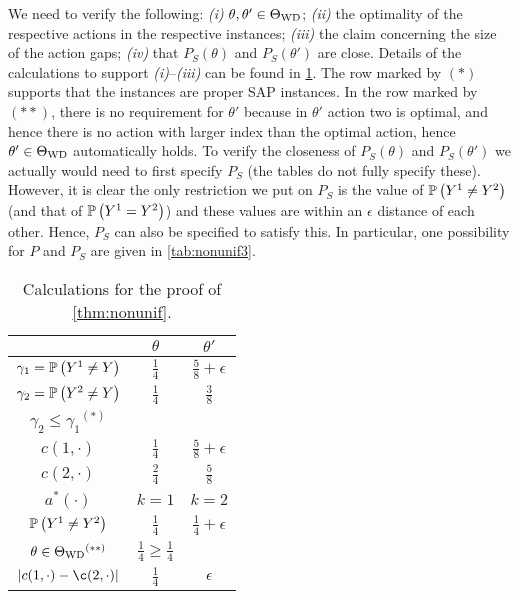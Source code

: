 We need to verify the following:
{\em (i)} $\theta,\theta'\in \Theta_{\mathrm{WD}}$;
{\em (ii)} the optimality of the respective actions in the respective instances;
{\em (iii)} the claim concerning the size of the action gaps;
{\em (iv)} that $P_S(\theta)$ and $P_S(\theta')$ are close.
Details of the calculations to support {\em (i)}--{\em (iii)} can be found in \cref{tab:nonunif2}.
The row marked by $(*)$ supports that the instances are proper SAP instances.
In the row marked by $(**)$, there is no requirement for $\theta'$ because 
in $\theta'$ action two is optimal, and hence there is no action with larger index 
than the optimal action, hence $\theta'\in \Theta_{\mathrm{WD}}$ automatically holds.
To verify the closeness of $P_S(\theta)$ and $P_S(\theta')$ we actually 
would need to first specify $P_S$ (the tables do not fully specify these).
However, it is clear the only restriction we put on $P_S$ is the value of $\mathbb{P}\left(Y^1\ne Y^2\right)$ (and
that of $\mathbb{P}\left(Y^1=Y^2\right)$) and these values are within an $\epsilon$ distance of each other.
Hence, $P_S$ can also be specified to satisfy this. In particular, one possibility for $P$ and $P_S$ are given in \cref{tab:nonunif3}.
\bgroup
\def\arraystretch{1.5}
\begin{table}[]
	\centering
	\begin{tabular}{|c|c|c|}
		\hline
		& $\theta$                & $\theta'$ \\ \hline
		$\gamma_1 = \mathbb{P}\left(Y^1\ne Y\right)$ & $\frac{1}{4}$           & $\frac{5}{8}+\epsilon$ \\ \hline
		$\gamma_2 = \mathbb{P}\left(Y^2\ne Y\right)$ & $\frac{1}{4}$           & $\frac{3}{8}$ \\ \hline
		$\gamma_2 \le \gamma_1 \mbox{}^{(*)}$        & \checkmark           & \checkmark \\ \hline
		$c(1,\cdot)$                                 & $\frac{1}{4}$           & $\frac{5}{8}+\epsilon$ \\ \hline
		$c(2,\cdot)$                                 & $\frac{2}{4}$           & $\frac{5}{8}$ \\ \hline
		$a^*(\cdot)$                                 & $k=1$                   & $k=2$ \\ \hline
		$\mathbb{P}\left(Y^1\ne Y^2\right)$                   & $\frac{1}{4}$         & $\frac{1}{4}+\epsilon$ \\ \hline
		$\theta \in \Theta_{\mathrm{WD}}  \mbox{}^{(**)}$                        & $\frac{1}{4}\ge \frac14$ \checkmark & \checkmark \\ \hline
		$|c(1,\cdot)-\c(2,\cdot)|$              & $\frac{1}{4}$         & $\epsilon$ \\ \hline
	\end{tabular}
	\vspace*{0.1in}
	\caption{Calculations for the proof of \cref{thm:nonunif}.}
	\label{tab:nonunif2}
\end{table}
\egroup

